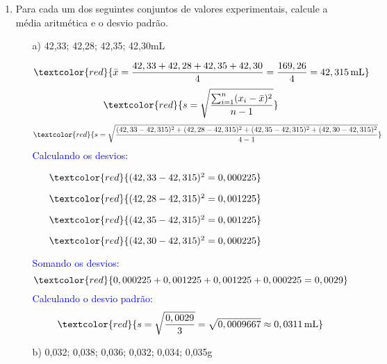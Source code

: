 \documentclass[a4paper, 12pt]{article}
\begin{document}
\begin{enumerate}
    \item Para cada um dos seguintes conjuntos de valores experimentais, calcule a média aritmética e o desvio padrão.
          \begin{enumerate}[align=left, labelsep=-0.5em]
              \item[a)] 42,33; 42,28; 42,35; 42,30mL

                    \textcolor{blue}{
                        \[
                            \textcolor{red}{\bar{x} = \frac{42,33 + 42,28 + 42,35 + 42,30}{4} = \frac{169,26}{4} = 42,315 \, \text{mL}}
                        \]
                        \[
                            \textcolor{red}{s = \sqrt{\frac{\sum_{i=1}^n (x_i - \bar{x})^2}{n - 1}}}
                        \]
                        \[
                            \textcolor{red}{s = \sqrt{\frac{(42,33 - 42,315)^2 + (42,28 - 42,315)^2 + (42,35 - 42,315)^2 + (42,30 - 42,315)^2}{4-1}}}
                        \]
                        Calculando os desvios:
                        \begin{multicols}{2}
                            \begin{itemize}
                                \item[] \(\textcolor{red}{(42,33 - 42,315)^2 = 0,000225}\)
                                \item[] \(\textcolor{red}{(42,28 - 42,315)^2 = 0,001225}\)
                                \item[] \(\textcolor{red}{(42,35 - 42,315)^2 = 0,001225}\)
                                \item[] \(\textcolor{red}{(42,30 - 42,315)^2 = 0,000225}\)
                            \end{itemize}
                        \end{multicols}
                        Somando os desvios:
                        \[
                            \textcolor{red}{0,000225 + 0,001225 + 0,001225 + 0,000225 = 0,0029}
                        \]
                        Calculando o desvio padrão:
                        \[
                            \textcolor{red}{s = \sqrt{\frac{0,0029}{3}} = \sqrt{0,0009667} \approx 0,0311 \, \text{mL}}
                        \]
                    }
              \item[b)] 0,032; 0,038; 0,036; 0,032; 0,034; 0,035g


\end{enumerate}
\end{enumerate}
\end{document}
